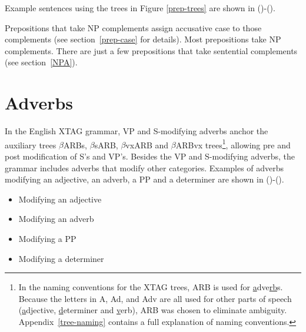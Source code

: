 Example sentences using the trees in Figure \ref{prep-trees} are shown
in ()-().



Prepositions that take NP complements assign accusative case to those
complements (see section~\ref{prep-case} for details).  Most prepositions take
NP complements.  There are just a few prepositions that take sentential
complements (see section~\ref{NPA}).



\section{Adverbs}
\label{adv-modifier}

In the English XTAG grammar, VP and S-modifying adverbs anchor the auxiliary
trees $\beta$ARBs, $\beta$sARB, $\beta$vxARB and $\beta$ARBvx trees\footnote{In
the naming conventions for the XTAG trees, ARB is used for {\underline
a}dve{\underline {rb}}s.  Because the letters in A, Ad, and Adv are all used
for other parts of speech ({\underline a}djective, {\underline d}eterminer and
{\underline v}erb), ARB was chosen to eliminate ambiguity.
Appendix~\ref{tree-naming} contains a full explanation of naming conventions.},
allowing pre and post modification of S's and VP's.  Besides the VP and
S-modifying adverbs, the grammar includes adverbs that modify other
categories. Examples of adverbs modifying an adjective, an adverb, a PP and a
determiner are shown in ()-().

\begin{itemize}
\item{Modifying an adjective}

\item{Modifying an adverb}

\item{Modifying a PP}

\item{Modifying a determiner}

\end{itemize}

